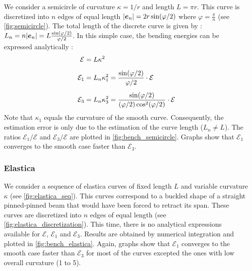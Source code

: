 We consider a semicircle of curvature $\kappa =1/r$ and length $L = \pi r$. This curve is discretized into $n$ edges of equal length $|\boldsymbol{e}_n| = 2r\sin (\varphi/2)$ where $\varphi = \tfrac{\pi}{n}$ (see \cref{fig:semicircle}). The total length of the discrete curve is given by : $L_n = n |\boldsymbol{e}_n| = L \frac{\sin(\varphi/2)}{\varphi/2}$. In this simple case, the bending energies can be expressed analytically :
\begin{equation}
\setlength{\jot}{8pt}
\begin{aligned}
	\mathcal{E} &= L \kappa^2 \\
	\mathcal{E}_1 &= L_n  \kappa_1^2 = \frac{\sin (\varphi/2)}{\varphi/2} \cdot \mathcal{E}  \\
	\mathcal{E}_3 &= L_n  \kappa_3^2 = \frac{\sin (\varphi/2)}{(\varphi/2) \cos^2 (\varphi/2)} \cdot \mathcal{E} 
\end{aligned}
\end{equation}
Note that $\kappa_1$ equals the curvature of the smooth curve. Consequently, the estimation error is only due to the estimation of the curve length ($L_n \neq L$). The ratios $\mathcal{E}_1/\mathcal{E}$ and $\mathcal{E}_3/\mathcal{E}$ are plotted in \cref{fig:bench_semicircle}. Graphs show that $\mathcal{E}_1$ converges to the smooth case faster than $\mathcal{E}_3$.


\subsubsection{Elastica}
We consider a sequence of elastica curves of fixed length $L$ and variable curvature $\kappa$ (see \cref{fig:elastica_seq}). This curves correspond to a buckled shape of a straight pinned-pinned beam that would have been forced to retract its span. These curves are discretized into $n$ edges of equal length (see \cref{fig:elastica_discretization}). This time, there is no analytical expressions available for $\mathcal{E}$, $\mathcal{E}_1$ and $\mathcal{E}_3$. Results are obtained by numerical integration and plotted in \cref{fig:bench_elastica}. Again, graphs show that $\mathcal{E}_1$ converges to the smooth case faster than $\mathcal{E}_3$ for most of the curves excepted the ones with low overall curvature (1 to 5).

